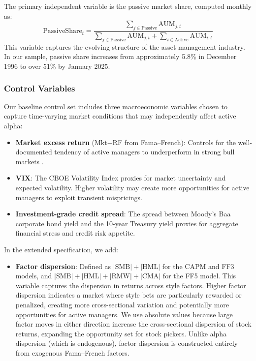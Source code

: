 \documentclass[11pt, a4paper]{article}
\begin{document}
The primary independent variable is the passive market share, computed monthly as:
\begin{equation}
    \text{PassiveShare}_t = \frac{\sum_{j \in \text{Passive}} \text{AUM}_{j,t}}{\sum_{j \in \text{Passive}} \text{AUM}_{j,t} + \sum_{i \in \text{Active}} \text{AUM}_{i,t}}
    \label{eq:passive_share}
\end{equation}
This variable captures the evolving structure of the asset management industry. In our sample, passive share increases from approximately 5.8\% in December 1996 to over 51\% by January 2025.

\subsubsection{Control Variables}

Our baseline control set includes three macroeconomic variables chosen to capture time-varying market conditions that may independently affect active alpha:

\begin{itemize}[noitemsep]
    \item \textbf{Market excess return} (Mkt$-$RF from Fama--French): Controls for the well-documented tendency of active managers to underperform in strong bull markets \parencite{fama2010}.
    \item \textbf{VIX}: The CBOE Volatility Index proxies for market uncertainty and expected volatility. Higher volatility may create more opportunities for active managers to exploit transient mispricings.
    \item \textbf{Investment-grade credit spread}: The spread between Moody's Baa corporate bond yield and the 10-year Treasury yield proxies for aggregate financial stress and credit risk appetite.
\end{itemize}

In the extended specification, we add:
\begin{itemize}[noitemsep]
    \item \textbf{Factor dispersion}: Defined as $|\text{SMB}| + |\text{HML}|$ for the CAPM and FF3 models, and $|\text{SMB}| + |\text{HML}| + |\text{RMW}| + |\text{CMA}|$ for the FF5 model. This variable captures the dispersion in returns across style factors. Higher factor dispersion indicates a market where style bets are particularly rewarded or penalized, creating more cross-sectional variation and potentially more opportunities for active managers. We use absolute values because large factor moves in either direction increase the cross-sectional dispersion of stock returns, expanding the opportunity set for stock pickers. Unlike alpha dispersion (which is endogenous), factor dispersion is constructed entirely from exogenous Fama--French factors.
\end{itemize}
\end{document}
